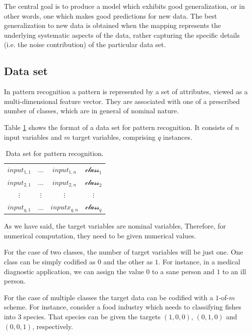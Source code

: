 The central goal is to produce a model which exhibits good generalization, or in other words, one which makes good predictions for new data. The best generalization to new data is obtained when the mapping represents the underlying
systematic aspects of the data, rather capturing the specific
details (i.e. the noise contribution) of the particular data set. 

\subsection*{Data set}

In pattern recognition a pattern is represented by a set of attributes, viewed as a multi-dimensional feature vector. 
They are associated with one of a prescribed number of classes, which are in general of nominal nature.  

Table \ref{PatternRecognitionDataSetTable} shows the format of a data set for pattern recognition.
It consists of $n$ input variables and $m$ target variables,
comprising $q$ instances.

\begin{table}[h!]
\begin{center}
\begin{tabular}{|ccc|c|}
\hline
$input_{1,1}$ & $\ldots$ & $input_{1,n}$ & $\mathcal{class}_{1}$\\
$input_{2,1}$ & $\ldots$ & $input_{2,n}$ & $\mathcal{class}_{2}$\\
$\vdots$  & $\vdots$ & $\vdots$  & $\vdots$\\ 
$input_{q,1}$ & $\ldots$ & $inputx_{q,n}$ & $\mathcal{class}_{q}$\\
\hline
\end{tabular}\caption{Data set for pattern recognition.}
\label{PatternRecognitionDataSetTable}
\end{center}
\end{table}

As we have said, the target variables are nominal variables,
Therefore, for numerical computation, they need to be given numerical values. 

For the case of two classes, the number of target variables will be just one.
One class can be simply codified as $0$ and the other as $1$. 
For instance, in a medical diagnostic application, we can assign the value $0$ to a sane person and $1$ to an ill person.

For the case of multiple classes  the target data can be codified with a $1$-of-$m$ scheme. 
For instance, consider a food industry which needs to classifying fishes into $3$ species. 
That species can be given the targets $(1,0,0)$, $(0,1,0)$ and $(0,0,1)$, respectively. 

